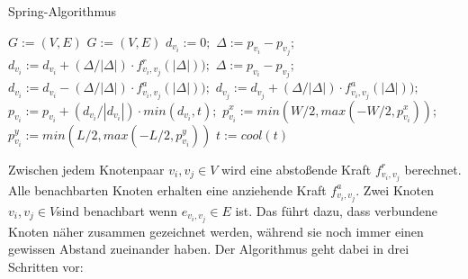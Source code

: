 \begin{algorithm}[t]
	\centering
	\caption[Spring-Algorithmus]{Spring-Algorithmus} \label{algo_1}
	\begin{algorithmic}[1]
		\REQUIRE \begin{math} G:= (V,E) \end{math}
		\ENSURE \begin{math} G:= (V,E) \end{math}
		\STATE $d_{v_{i}} := 0;$
		\STATE $\Delta := p_{v_{i}} - p_{v_{j}};$
		\STATE $d_{v_{i}} := d_{v_{i}} + (\Delta / |\Delta|) \cdot f^{r}_{v_{i},v_{j}}(|\Delta|));$
		\ENDIF
		\ENDFOR
		\ENDFOR
		\newline
		\STATE $\Delta := p_{v_{i}} - p_{v_{j}};$
		\STATE $d_{v_{i}} := d_{v_{i}} - (\Delta / |\Delta|) \cdot f^{a}_{v_{i},v_{j}}(|\Delta|));$
		\STATE $d_{v_{j}} := d_{v_{j}} + (\Delta / |\Delta|) \cdot f^{a}_{v_{i},v_{j}}(|\Delta|));$
		\ENDFOR
		\newline
		\STATE $p_{v_{i}} := p_{v_{i}} + ( d_{v_{i}}/ |d_{v_{i}}|) \cdot min ( d_{v_{i}}, t );$
		\STATE $p_{v_{i}}^{x} := min(W/2, max(-W/2, p_{v_{i}}^{x}));$
		\STATE $p_{v_{i}}^{y} := min(L/2, max(-L/2, p_{v_{i}}^{y}))$
		\ENDFOR
		\STATE $t:= cool(t)$
		\ENDFOR
	\end{algorithmic}
\end{algorithm}

Zwischen jedem Knotenpaar $v_{i},v_{j} \in V$ wird eine abstoßende Kraft \begin{math} f^{r}_{v_{i},v_{j}}  \end{math} berechnet.   Alle
benachbarten Knoten erhalten eine anziehende Kraft \begin{math} f^{a}_{v_{i},v_{j}} \end{math}. Zwei Knoten \begin{math} v_{i},v_{j} \in V \end{math}sind benachbart wenn \begin{math} e_{v_{i},v_{j}} \in E \end{math} ist. Das führt dazu, dass verbundene Knoten näher zusammen
gezeichnet werden, während sie noch immer einen gewissen Abstand zueinander
haben. Der Algorithmus geht dabei in drei Schritten vor:

